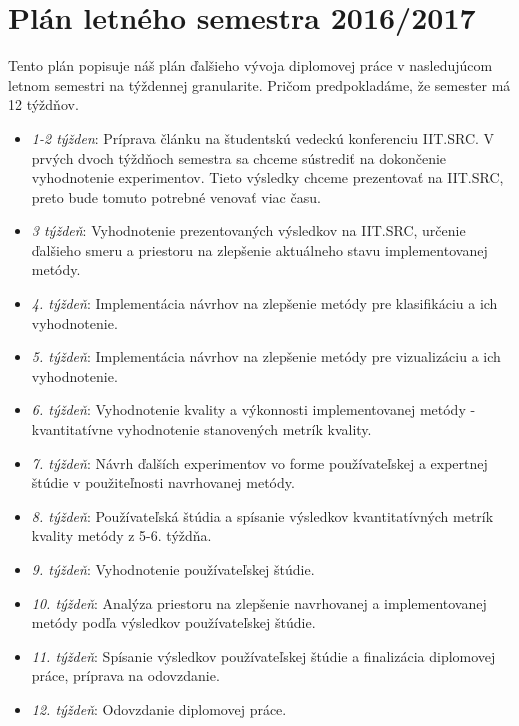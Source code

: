 \section{Plán letného semestra 2016/2017}\label{plan-leto}
Tento plán popisuje náš plán ďalšieho vývoja diplomovej práce v nasledujúcom letnom semestri na týždennej granularite. Pričom predpokladáme, že semester má 12 týždňov.
\begin{itemize}
	\item \textit{1-2 týžden}: Príprava článku na študentskú vedeckú konferenciu IIT.SRC. V prvých dvoch týždňoch semestra sa chceme sústrediť na dokončenie vyhodnotenie experimentov. Tieto výsledky chceme prezentovať na IIT.SRC, preto bude tomuto potrebné venovať viac času.
	\item \textit{3 týždeň}: Vyhodnotenie prezentovaných výsledkov na IIT.SRC, určenie ďalšieho smeru a priestoru na zlepšenie aktuálneho stavu implementovanej metódy.
	\item \textit{4. týždeň}: Implementácia návrhov na zlepšenie metódy pre klasifikáciu a ich vyhodnotenie.
	\item \textit{5. týždeň}: Implementácia návrhov na zlepšenie metódy pre vizualizáciu a ich vyhodnotenie. 
	\item \textit{6. týždeň}: Vyhodnotenie kvality a výkonnosti implementovanej metódy - kvantitatívne vyhodnotenie stanovených metrík kvality.
	\item \textit{7. týždeň}: Návrh ďalších experimentov vo forme používateľskej a expertnej štúdie v použiteľnosti navrhovanej metódy.
	\item \textit{8. týždeň}: Používateľská štúdia a spísanie výsledkov kvantitatívných metrík kvality metódy z 5-6. týždňa.
	\item \textit{9. týždeň}: Vyhodnotenie používateľskej štúdie.
	\item \textit{10. týždeň}: Analýza priestoru na zlepšenie navrhovanej a implementovanej metódy podľa výsledkov používateľskej štúdie.
	\item \textit{11. týždeň}: Spísanie výsledkov používateľskej štúdie a finalizácia diplomovej práce, príprava na odovzdanie.
	\item \textit{12. týždeň}: Odovzdanie diplomovej práce.
\end{itemize}

